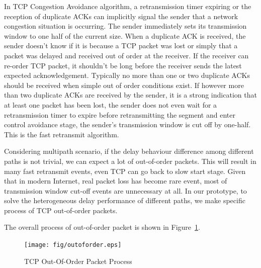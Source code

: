 In TCP Congestion Avoidance algorithm, a retransmission timer expiring or the reception of duplicate ACKs can implicitly signal the sender that a network congestion situation is occurring. The sender immediately sets its transmission window to one half of the current size. When a duplicate ACK is received, the sender doesn't know if it is because a TCP packet was lost or simply that a packet was delayed and received out of order at the receiver. If the receiver can re-order TCP packet, it shouldn't be long before the receiver sends the latest expected acknowledgement. Typically no more than one or two duplicate ACKs should be received when simple out of order conditions exist. If however more than two duplicate ACKs are received by the sender, it is a strong indication that at least one packet has been lost, the sender does not even wait for a retransmission timer to expire before retransmitting the segment and enter control avoidance stage, the sender's transmission window is cut off by one-half. This is the fast retransmit algorithm.


Considering multipath scenario, if the delay behaviour difference among different paths is not trivial, we can expect a lot of out-of-order packets. This will result in many fast retransmit events, even TCP can go back to slow start stage. Given that in modern Internet, real packet loss has become rare event, most of transmission window cut-off events are unnecessary at all. In our prototype, to solve the heterogeneous delay performance of different paths, we make specific process of TCP out-of-order packets.

The overall process of out-of-order packet is shown in Figure~\ref{fig.outoforder}.

\begin{figure}
\centering
\texttt{[image: fig/outoforder.eps]}
\caption{TCP Out-Of-Order Packet Process}
\label{fig.outoforder}
\end{figure}


